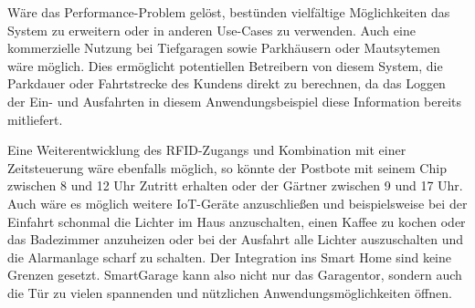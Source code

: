 Wäre das Performance-Problem gelöst, bestünden vielfältige Möglichkeiten das System zu erweitern oder in anderen Use-Cases zu verwenden. 
Auch eine kommerzielle Nutzung bei Tiefgaragen sowie Parkhäusern oder Mautsytemen wäre möglich. Dies ermöglicht potentiellen Betreibern von diesem System, die Parkdauer oder Fahrtstrecke des Kundens direkt zu berechnen, da das Loggen der Ein- und Ausfahrten in diesem Anwendungsbeispiel diese Information bereits mitliefert. 

Eine Weiterentwicklung des RFID-Zugangs und Kombination mit einer Zeitsteuerung wäre ebenfalls möglich, so könnte der Postbote mit seinem Chip zwischen 8 und 12 Uhr Zutritt erhalten oder der Gärtner zwischen 9 und 17 Uhr.
Auch wäre es möglich weitere IoT-Geräte anzuschließen und beispielsweise bei der Einfahrt schonmal die Lichter im Haus anzuschalten, einen Kaffee zu kochen oder das Badezimmer anzuheizen oder bei der Ausfahrt alle Lichter auszuschalten und die Alarmanlage scharf zu schalten. Der Integration ins Smart Home sind keine Grenzen gesetzt. SmartGarage kann also nicht nur das Garagentor, sondern auch die Tür zu vielen spannenden und nützlichen Anwendungsmöglichkeiten öffnen.




